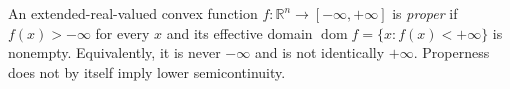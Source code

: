 
An extended-real-valued convex function $f:\mathbb R^n\to[-\infty,+\infty]$ is \emph{proper} if $f(x)>-\infty$ for every $x$ and its effective domain $\operatorname{dom}f=\{x:f(x)<+\infty\}$ is nonempty. Equivalently, it is never $-\infty$ and is not identically $+\infty$. Properness does not by itself imply lower semicontinuity.
